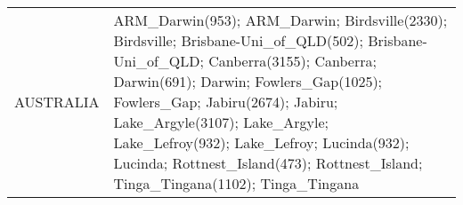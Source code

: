 \documentclass[journal abbreviation, manuscript]{copernicus}
\begin{document}
\begin{table}
\begin{tabularx}{\textwidth}{lX}
  AUSTRALIA & ARM\_Darwin(953); ARM\_Darwin; Birdsville(2330); Birdsville; Brisbane-Uni\_of\_QLD(502); Brisbane-Uni\_of\_QLD; Canberra(3155); Canberra; Darwin(691); Darwin; Fowlers\_Gap(1025); Fowlers\_Gap; Jabiru(2674); Jabiru; Lake\_Argyle(3107); Lake\_Argyle; Lake\_Lefroy(932); Lake\_Lefroy; Lucinda(932); Lucinda; Rottnest\_Island(473); Rottnest\_Island; Tinga\_Tingana(1102); Tinga\_Tingana                                                                                                                                                                                                                                                                                                                                                                                                                                                                                                                                                                                                                                                                                                                                                                                                                                                                                                                                                                                                                                                                                                                                                                                                                                                                                                                                                                                                                                                                                                                                                                                                                                                                                                                                                                                                                                                                                                                                                                                                                                                                                                                                                                                                                                                                                                                                                                                                                                                                                                                                                                                                                                                                                                                                                                                                                                                                                                                                                                                                             
\end{tabularx}
\end{table}
\end{document}
